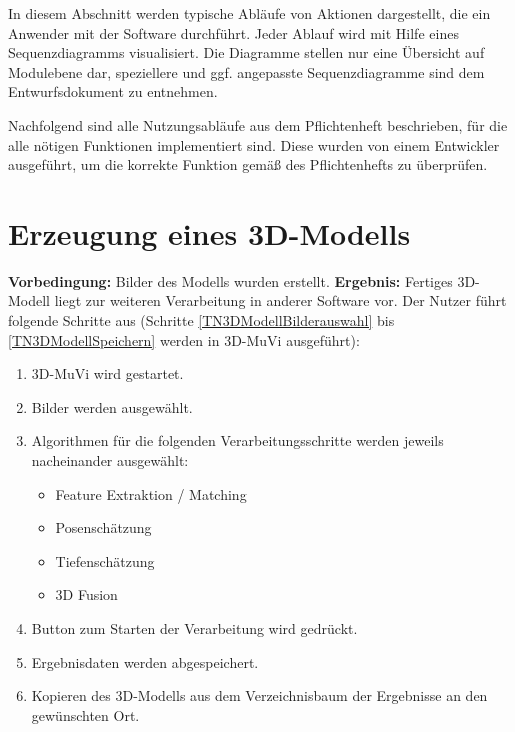 In diesem Abschnitt werden typische Abläufe von Aktionen dargestellt, die ein Anwender mit der Software durchführt. Jeder Ablauf wird mit Hilfe eines Sequenzdiagramms visualisiert. Die Diagramme stellen nur eine Übersicht auf Modulebene dar, speziellere und ggf. angepasste Sequenzdiagramme sind dem Entwurfsdokument zu entnehmen.
\par
Nachfolgend sind alle Nutzungsabläufe aus dem Pflichtenheft beschrieben, für die alle nötigen Funktionen implementiert sind. Diese wurden von einem Entwickler ausgeführt, um die korrekte Funktion gemäß des Pflichtenhefts zu überprüfen.

\section{Erzeugung eines 3D-Modells}
\textbf{Vorbedingung:} Bilder des Modells wurden erstellt. \newline
\textbf{Ergebnis:} Fertiges 3D-Modell liegt zur weiteren Verarbeitung in anderer Software vor. \newline
Der Nutzer führt folgende Schritte aus (Schritte \ref{TN3DModellBilderauswahl} bis \ref{TN3DModellSpeichern} werden in 3D-MuVi ausgeführt):
\begin{enumerate}
	\item 3D-MuVi wird gestartet.
	\item \label{TN3DModellBilderauswahl} Bilder werden ausgewählt.
	\item Algorithmen für die folgenden Verarbeitungsschritte werden jeweils nacheinander ausgewählt:
	\begin{itemize}
		\item Feature Extraktion / Matching
		\item Posenschätzung
		\item Tiefenschätzung
		\item 3D Fusion
	\end{itemize}
	\item Button zum Starten der Verarbeitung wird gedrückt.
	\item \label{TN3DModellSpeichern} Ergebnisdaten werden abgespeichert.
	\item Kopieren des 3D-Modells aus dem Verzeichnisbaum der Ergebnisse an den gewünschten Ort.
\end{enumerate}
